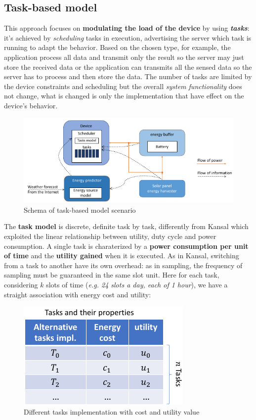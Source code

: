 \documentclass[10pt,a4paper]{report}
\theoremstyle{definition}
\begin{document}
\subsection{Task-based model}\label{sec:task-based-model}
This approach focuses on \textbf{modulating the load of the device} by using \textit{\textbf{tasks}}: it's achieved by \textit{scheduling} tasks in execution, advertising the server which task is running to adapt the behavior. Based on the chosen type, for example, the application process all data and transmit only the result so the server may just store the received data or the application can transmits all the sensed data so the server has to process and then store the data. The number of tasks are limited by the device constraints and scheduling but the overall \textit{system functionality} does not change, what is changed is only the implementation that have effect on the device's behavior.
\begin{figure}[h]
	\centering\includegraphics[scale=0.50]{images/Pasted image 20230514104525.png}
	\caption{Schema of task-based model scenario}
\end{figure}

The \textbf{task model} is discrete, definite task by task, differently from Kansal which exploited the linear relationship between utility, duty cycle and power consumption. A single task is charaterized by a \textbf{power consumption per unit of time} and the \textbf{utility gained} when it is executed.
As in Kansal, switching from a task to another have its own overhead: as in sampling, the frequency of sampling must be guaranteed in the same slot unit.
Here for each task, considering $k$ slots of time (\textit{e.g. 24 slots a day, each of 1 hour}), we have a straight association with energy cost and utility:
\begin{figure}[h]
	\centering\includegraphics[scale=0.50]{images/Pasted image 20230514104715.png}
	\caption{Different tasks implementation with cost and utility value}
\end{figure}
\end{document}
